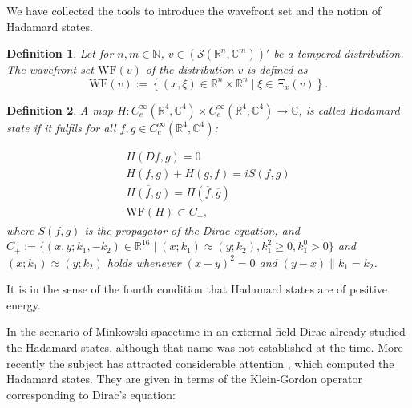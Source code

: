\documentclass[b5paper,draft,openbib,12pt]{memoir}
\newtheorem{Def}{Definition}
\begin{document}
We have collected the tools to introduce the wavefront set and the notion of Hadamard states.

\begin{Def}
Let for \(n,m\in\mathbb{N}\), \(v\in (\mathcal{S}(\mathbb{R}^n,\mathbb{C}^m))'\) be a tempered distribution. The wavefront set \(\mathrm{WF}(v)\) of 
the distribution \(v\) is defined as 
\begin{equation}
\mathrm{WF}(v):= \left\{(x,\xi)\in \mathbb{R}^n\times \mathbb{R}^n\mid \xi \in \Xi_x(v) \right\}.
\end{equation}
\end{Def}

\begin{Def}\label{def: hadamard}
A map \(H: C_c^\infty(\mathbb{R}^4,\mathbb{C}^4)\times C_c^\infty(\mathbb{R}^4,\mathbb{C}^4) \rightarrow \mathbb{C}\), is called Hadamard state if it fulfils
for all \( f,g\in C_c^\infty(\mathbb{R}^4,\mathbb{C}^4)\):

\begin{align}
H(Df,g)=0\\
H(f,g)+H(g,f)=i S(f,g)\\
\overline{H(f,g)}=H(\overline{f},\overline{g})\\
\text{WF}(H)\subset C_+,
\end{align}
where \(S(f,g)\) is the propagator of the Dirac equation, 
  and  \(C_+:=\{(x,y;k_1,-k_2)\in\mathbb{R}^{16}\mid (x;k_1)\approx (y;k_2) , k_1^2\ge0, k_1^0>0\}\)
and \((x;k_1)\approx(y;k_2)\) holds whenever \((x-y)^2=0\) and \((y-x)\parallel k_1 = k_2\).
\end{Def}
It is in the sense of the fourth condition that Hadamard states are of positive energy.

In the scenario of Minkowski spacetime in an external field Dirac \cite{Dirac34} already studied the Hadamard states, although that name was not established at the time.
More recently the subject has attracted considerable attention \cite{zahn2014renormalized, schlemmer2015current}, which computed the Hadamard states. 
They are given in terms of the Klein-Gordon operator corresponding to Dirac's equation:
\end{document}
